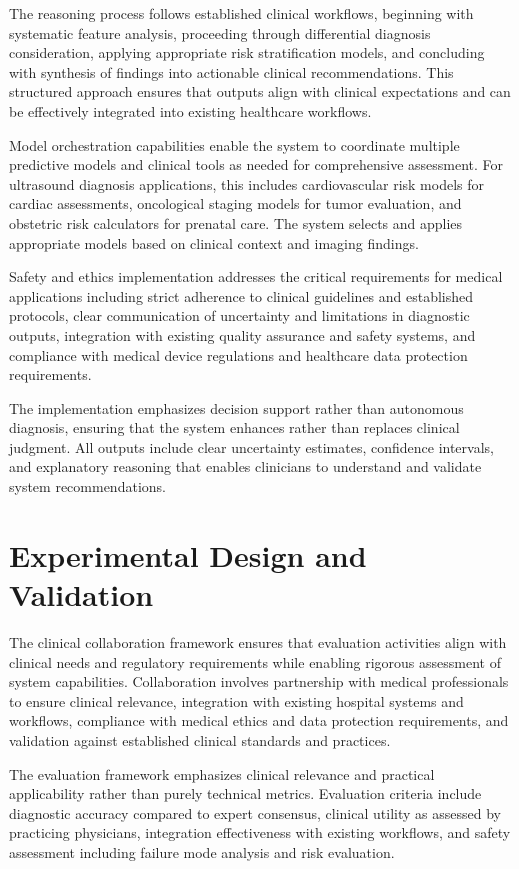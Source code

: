 The reasoning process follows established clinical workflows, beginning with systematic feature analysis, proceeding through differential diagnosis consideration, applying appropriate risk stratification models, and concluding with synthesis of findings into actionable clinical recommendations. This structured approach ensures that outputs align with clinical expectations and can be effectively integrated into existing healthcare workflows.

Model orchestration capabilities enable the system to coordinate multiple predictive models and clinical tools as needed for comprehensive assessment. For ultrasound diagnosis applications, this includes cardiovascular risk models for cardiac assessments, oncological staging models for tumor evaluation, and obstetric risk calculators for prenatal care. The system selects and applies appropriate models based on clinical context and imaging findings.

Safety and ethics implementation addresses the critical requirements for medical applications including strict adherence to clinical guidelines and established protocols, clear communication of uncertainty and limitations in diagnostic outputs, integration with existing quality assurance and safety systems, and compliance with medical device regulations and healthcare data protection requirements.

The implementation emphasizes decision support rather than autonomous diagnosis, ensuring that the system enhances rather than replaces clinical judgment. All outputs include clear uncertainty estimates, confidence intervals, and explanatory reasoning that enables clinicians to understand and validate system recommendations.

\section{Experimental Design and Validation}

The clinical collaboration framework ensures that evaluation activities align with clinical needs and regulatory requirements while enabling rigorous assessment of system capabilities. Collaboration involves partnership with medical professionals to ensure clinical relevance, integration with existing hospital systems and workflows, compliance with medical ethics and data protection requirements, and validation against established clinical standards and practices.

The evaluation framework emphasizes clinical relevance and practical applicability rather than purely technical metrics. Evaluation criteria include diagnostic accuracy compared to expert consensus, clinical utility as assessed by practicing physicians, integration effectiveness with existing workflows, and safety assessment including failure mode analysis and risk evaluation.

